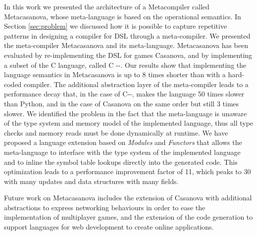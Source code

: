 In this work we presented the architecture of a Metacompiler called Metacasanova, whose meta-language is based on the operational semantics. In Section \ref{sec:problem} we discussed how it is possible to capture repetitive patterns in designing a compiler for DSL through a meta-compiler. We presented the meta-compiler Metacasanova and its meta-language. Metacasanova has been evaluated by re-implementing the DSL for games Casanova, and by implementing a subset of the C language, called C -{}-. Our results show that implementing the language semantics in Metacasanova is up to 8 times shorter than with a hard-coded compiler. The additional abstraction layer of the meta-compiler leads to a performance decay that, in the case of C-{}-, makes the language 50 times slower than Python, and in the case of Casanova on the same order but still 3 times slower. We identified the problem in the fact that the meta-language is unaware of the type system and memory model of the implemented language, thus all type checks and memory reads must be done dynamically at runtime. We have proposed a language extension based on \textit{Modules} and \textit{Functors} that allows the meta-language to interface with the type system of the implemented language and to inline the symbol table lookups directly into the generated code. This optimization leads to a performance improvement factor of 11, which peaks to 30 with many updates and data structures with many fields. 

Future work on Metacasanova includes the extension of Casanova with additional abstractions to express networking behaviours in order to ease the implementation of multiplayer games, and the extension of the code generation to support languages for web development to create online applications.